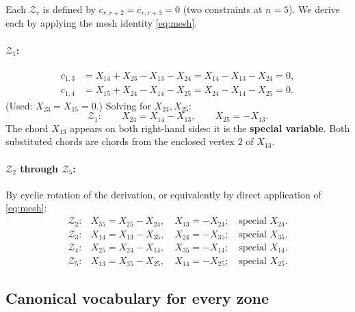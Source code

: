 \documentclass[11pt]{article}
\newcommand{\X}[2]{X_{#1#2}}
\newcommand{\Z}{\mathcal{Z}}
\theoremstyle{definition}
\begin{document}
Each $\Z_r$ is defined by $c_{r,r+2}=c_{r,r+3}=0$ (two constraints at $n=5$).
We derive each by applying the mesh identity \eqref{eq:mesh}.

\paragraph{$\Z_1$:}
\begin{align*}
c_{1,3}&=\X{1}{4}+\X{2}{3}-\X{1}{3}-\X{2}{4}=\X{1}{4}-\X{1}{3}-\X{2}{4}=0,\\
c_{1,4}&=\X{1}{5}+\X{2}{4}-\X{1}{4}-\X{2}{5}=\X{2}{4}-\X{1}{4}-\X{2}{5}=0.
\end{align*}
(Used: $\X{2}{3}=\X{1}{5}=0$.) Solving for $\X{2}{4}, \X{2}{5}$:
\begin{equation}
\Z_1:\qquad \X{2}{4}=\X{1}{4}-\X{1}{3},\qquad \X{2}{5}=-\X{1}{3}.
\end{equation}
The chord $\X{1}{3}$ appears on both right-hand sides: it is the
\textbf{special variable}. Both substituted chords are chords from the
enclosed vertex $2$ of $\X{1}{3}$.

\paragraph{$\Z_2$ through $\Z_5$:} By cyclic rotation of the derivation,
or equivalently by direct application of \eqref{eq:mesh}:
\begin{align}
\Z_2:& \X{3}{5}=\X{2}{5}-\X{2}{4},\quad \X{1}{3}=-\X{2}{4}; \quad\text{special }\X{2}{4}.\\
\Z_3:& \X{1}{4}=\X{1}{3}-\X{3}{5},\quad \X{2}{4}=-\X{3}{5}; \quad\text{special }\X{3}{5}.\\
\Z_4:& \X{2}{5}=\X{2}{4}-\X{1}{4},\quad \X{3}{5}=-\X{1}{4}; \quad\text{special }\X{1}{4}.\\
\Z_5:& \X{1}{3}=\X{3}{5}-\X{2}{5},\quad \X{1}{4}=-\X{2}{5}; \quad\text{special }\X{2}{5}.
\end{align}

\subsection{Canonical vocabulary for every zone}
\end{document}
